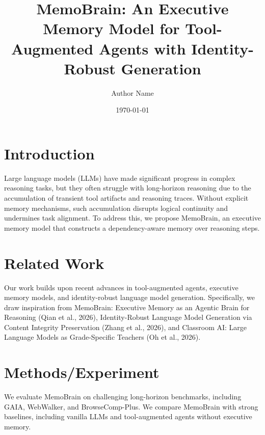 \documentclass{article}
\begin{document}
\title{MemoBrain: An Executive Memory Model for Tool-Augmented Agents with Identity-Robust Generation}

\author{Author Name}

\date{\today}

\maketitle


\section{Introduction}
Large language models (LLMs) have made significant progress in complex reasoning tasks, but they often struggle with long-horizon reasoning due to the accumulation of transient tool artifacts and reasoning traces. Without explicit memory mechanisms, such accumulation disrupts logical continuity and undermines task alignment. To address this, we propose MemoBrain, an executive memory model that constructs a dependency-aware memory over reasoning steps.

\section{Related Work}
Our work builds upon recent advances in tool-augmented agents, executive memory models, and identity-robust language model generation. Specifically, we draw inspiration from MemoBrain: Executive Memory as an Agentic Brain for Reasoning (Qian et al., 2026), Identity-Robust Language Model Generation via Content Integrity Preservation (Zhang et al., 2026), and Classroom AI: Large Language Models as Grade-Specific Teachers (Oh et al., 2026).

\section{Methods/Experiment}
We evaluate MemoBrain on challenging long-horizon benchmarks, including GAIA, WebWalker, and BrowseComp-Plus. We compare MemoBrain with strong baselines, including vanilla LLMs and tool-augmented agents without executive memory.
\end{document}
